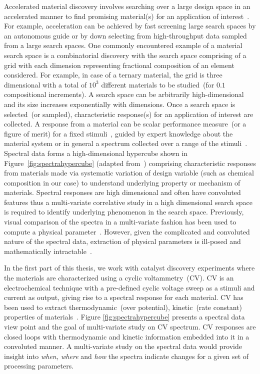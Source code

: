 Accelerated material discovery involves searching over a large design space in an accelerated manner to find promising material(s) for an application of interest~\cite{ajayi2016rapid}.
For example, acceleration can be achieved by fast screening large search spaces by an autonomous guide or by down selecting from high-throughput data sampled from a large search spaces. 
One commonly encountered example of a material search space is a combinatorial discovery with the search space comprising of a grid with each dimension representing fractional composition of an element considered.
For example, in case of a ternary material, the grid is three dimensional with a total of \(10^3\) different materials to be studied~(for \(0.1\) compositional increments). 
A search space can be arbitrarily high-dimensional and its size increases exponentially with dimensions. 
Once a search space is selected~(or sampled), characteristic response(s) for an application of interest are collected. 
A response from a material can be scalar performance measure~(or a figure of merit) for a fixed stimuli~\cite{haber2014high,suram2015generating}, guided by expert knowledge about the material system or in general a spectrum collected over a range of the stimuli~\cite{hattrick2016perspective}. 
Spectral data forms a high-dimensional hypercube shown in Figure~\ref{fig:spectrahypercube} (adapted from~\cite{rajan2013informatics}) comprising characteristic responses from materials made via systematic variation of design variable (such as chemical composition in our case) to understand underlying property or mechanism of materials.
Spectral responses are high dimensional and often have convoluted features thus a multi-variate correlative study in a high dimensional search space is required to identify underlying phenomenon in the search space.
Previously, visual comparison of the spectra in a multi-variate fashion has been used to compute a physical parameter~\cite{de2008core,de19902p}. 
However, given the complicated and convoluted nature of the spectral data, extraction of physical parameters is ill-posed and mathematically intractable~\cite{suzuki2019automated}. 

In the first part of this thesis, we work with catalyst discovery experiments where the materials are characterized using a cyclic voltammetry~(CV). 
CV is an electrochemical technique with a pre-defined cyclic voltage sweep as a stimuli and current as output, giving rise to a spectral response for each material. 
CV has been used to extract thermodynamic~(over potential), kinetic~(rate constant) properties of materials~\cite{martin2016qualitative,rountree2014evaluation,haber2014high}. 
Figure \ref{fig:spectrahypercube} presents a spectral data view point and the goal of multi-variate study on CV spectrum. 
CV responses are closed loops with thermodynamic and kinetic information embedded into it in a convoluted manner. 
A multi-variate study on the spectral data would provide insight into \textit{when, where} and \textit{how} the spectra indicate changes for a given set of processing parameters.

